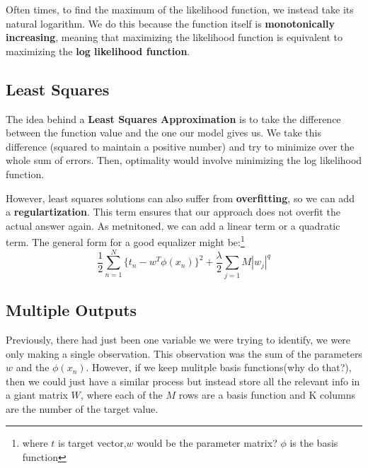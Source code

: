 \documentclass{tufte-handout}
\begin{document}
	Often times, to find the maximum of the likelihood function, we instead take its natural
	logarithm. We do this because the function itself is \textbf{monotonically increasing},
	meaning that maximizing the likelihood function is equivalent to maximizing the 
	\textbf{log likelihood function}.
	\subsection{Least Squares}
	The idea behind a \textbf{Least Squares Approximation} is to take the difference between the 
	function value and the one our model gives us. We take this difference (squared to maintain a
	positive number) and try to minimize over the whole sum of errors. Then, optimality would involve
	minimizing the log likelihood function.

	However, least squares solutions can also suffer from \textbf{overfitting}, so we can add
	a \textbf{regulartization}. This term ensures that our approach does not overfit the actual
	answer again. As metnitoned, we can add a linear term or a quadratic term. The general form 
	for a good equalizer might be:\footnote{where $t$ is target vector,$w$ would be the 
	parameter matrix? $\phi$ is the basis function}
	\[ \frac{1}{2}\sum_{n=1}^{N}\{t_{n}-w^{T}\phi(x_{n})\}^{2}+ \frac{\lambda}{2}\sum_{j=1}{M}|w_{j}|^{q} \]
	\subsection{Multiple Outputs}
	Previously, there had just been one variable we were trying to identify, we were only making a single
	observation. This observation was the sum of the parameters $w$ and the $\phi(x_{n})$. However, if we 
	keep mulitple basis functions(why do that?), then we could just have a similar process but instead store
	all the relevant info in a giant matrix $W$, where each of the $M$ rows are a basis function and K
	columns are the number of the target value.
\end{document}
